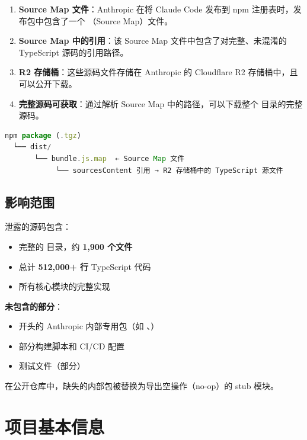 \begin{enumerate}[nosep]
  \item \textbf{Source Map 文件}：Anthropic 在将 Claude Code 发布到 npm 注册表时，发布包中包含了一个 （Source Map）文件。
  \item \textbf{Source Map 中的引用}：该 Source Map 文件中包含了对完整、未混淆的 TypeScript 源码的引用路径。
  \item \textbf{R2 存储桶}：这些源码文件存储在 Anthropic 的 Cloudflare R2 存储桶中，且可以公开下载。
  \item \textbf{完整源码可获取}：通过解析 Source Map 中的路径，可以下载整个  目录的完整源码。
\end{enumerate}

\begin{lstlisting}[language=TypeScript,breaklines=true]
npm package (.tgz)
  └── dist/
       └── bundle.js.map  ← Source Map 文件
            └── sourcesContent 引用 → R2 存储桶中的 TypeScript 源文件
\end{lstlisting}

\subsection{影响范围}

泄露的源码包含：
\begin{itemize}[nosep]
  \item 完整的  目录，约 \textbf{1,900 个文件}
  \item 总计 \textbf{512,000+ 行} TypeScript 代码
  \item 所有核心模块的完整实现
\end{itemize}

\textbf{未包含的部分}：
\begin{itemize}[nosep]
  \item {} 开头的 Anthropic 内部专用包（如 、）
  \item 部分构建脚本和 CI/CD 配置
  \item 测试文件（部分）
\end{itemize}

在公开仓库中，缺失的内部包被替换为导出空操作（no-op）的 stub 模块。

\section{项目基本信息}


